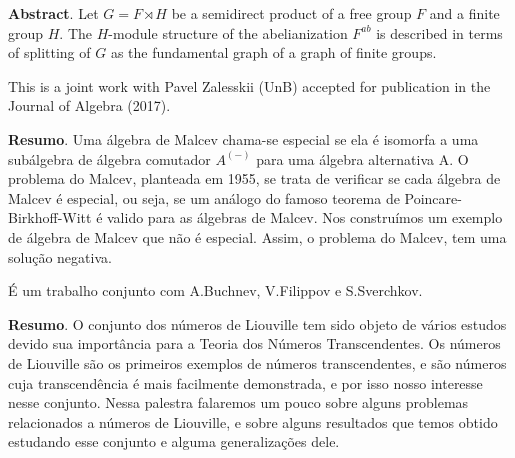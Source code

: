 

	\noindent\textbf{Abstract}.\label{isl} Let $G=F \rtimes H$ be a semidirect product of a free group $F$ and a finite group $H$. The $H$-module structure of the abelianization $F^{ab}$ is described in terms of splitting  of $G$ as the fundamental graph of a graph of finite groups.

	\vspace*{0.5cm} \noindent This is a joint work with Pavel Zalesskii (UnB) accepted for publication in the Journal of Algebra (2017).

\vspace{24pt}
	
	
	
	\noindent\textbf{Resumo}.\label{is} 
	Uma álgebra de Malcev chama-se especial se ela é isomorfa a uma subálgebra de álgebra comutador $A^{(-)}$ para uma álgebra alternativa A. O problema do Malcev, planteada em 1955, se trata de verificar se cada álgebra de Malcev é especial, ou seja, se um análogo do famoso teorema de Poincare-Birkhoff-Witt é valido para as álgebras de Malcev. Nos construímos um exemplo de álgebra de Malcev que não é especial. Assim, o problema do Malcev,  tem uma solução negativa.
	
	\vspace*{0.5cm} \noindent É um trabalho conjunto com A.Buchnev, V.Filippov e S.Sverchkov.
	
	\vspace{24pt}
	
	
	\noindent\textbf{Resumo}.\label{jca} 
	O conjunto dos números de Liouville tem sido objeto de vários estudos devido sua importância para a Teoria dos Números Transcendentes. Os números de Liouville são os primeiros exemplos de números transcendentes, e são números cuja transcendência é mais facilmente demonstrada, e por isso nosso interesse nesse conjunto. Nessa palestra falaremos um pouco sobre alguns problemas relacionados a números de Liouville, e sobre alguns resultados que temos obtido estudando esse conjunto e alguma generalizações dele.
	
